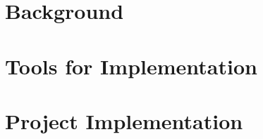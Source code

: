 \documentclass{report}
\begin{document}
\chapter{Background}




\chapter{Tools for Implementation}



\chapter{Project Implementation}



\printbibliography

\begin{appendices}
  
\end{appendices}
\end{document}
